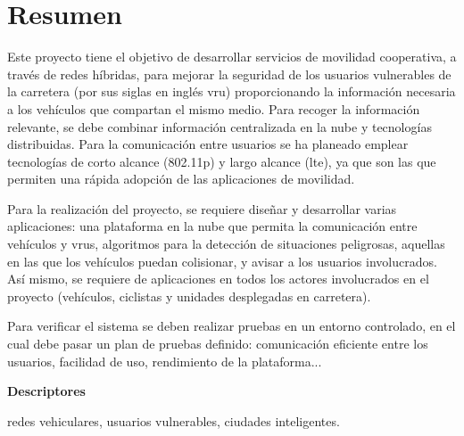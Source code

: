 \chapter*{Resumen}
Este proyecto tiene el objetivo de desarrollar servicios de movilidad cooperativa, a través de redes híbridas, para mejorar la seguridad de los usuarios vulnerables de la carretera (por sus siglas en inglés \gls{vru}) proporcionando la información necesaria a los vehículos que compartan el mismo medio. Para recoger la información relevante, se debe combinar información centralizada en la nube y tecnologías distribuidas. Para la comunicación entre usuarios se ha planeado emplear tecnologías de corto alcance (\Gls{802.11p}) y largo alcance (\gls{lte}), ya que son las que permiten una rápida adopción de las aplicaciones de movilidad.

Para la realización del proyecto, se requiere diseñar y desarrollar varias aplicaciones: una plataforma en la nube que permita la comunicación entre vehículos y \gls{vru}s, algoritmos para la detección de situaciones peligrosas, aquellas en las que los vehículos puedan colisionar, y avisar a los usuarios involucrados. Así mismo, se requiere de aplicaciones en todos los actores involucrados en el proyecto (vehículos, ciclistas y unidades desplegadas en carretera).

Para verificar el sistema se deben realizar pruebas en un entorno controlado, en el cual debe pasar un plan de pruebas definido: comunicación eficiente entre los usuarios, facilidad de uso, rendimiento de la plataforma...

\vspace{2em}

{\Large\bfseries\sectionfont Descriptores}
\vspace{3\medskipamount}

redes vehiculares, usuarios vulnerables, ciudades inteligentes.

\cleardoublepage\tableofcontents
\cleardoublepage\listoffigures
\cleardoublepage\listoftables
\cleardoublepage\listoflistings

\mainmatter
\pagestyle{phdthesis}
